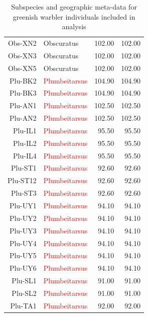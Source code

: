 \documentclass[12pt]{article}
\begin{document}
\begin{table}
\begin{tabular}{rlrr}
   Obs-XN2 & \textcolor{BurntOrange}{Obscuratus} & 102.00 & 102.00 \\ 
   Obs-XN3 & \textcolor{BurntOrange}{Obscuratus} & 102.00 & 102.00 \\ 
   Obs-XN5 & \textcolor{BurntOrange}{Obscuratus} & 102.00 & 102.00 \\ 
      \hline
   Plu-BK2 & \textcolor{red}{Plumbeitarsus} & 104.90 & 104.90 \\ 
   Plu-BK3 & \textcolor{red}{Plumbeitarsus} & 104.90 & 104.90 \\ 
   Plu-AN1 & \textcolor{red}{Plumbeitarsus} & 102.50 & 102.50 \\ 
   Plu-AN2  & \textcolor{red}{Plumbeitarsus} & 102.50 & 102.50 \\ 
   Plu-IL1 & \textcolor{red}{Plumbeitarsus} & 95.50 & 95.50 \\ 
   Plu-IL2 & \textcolor{red}{Plumbeitarsus} & 95.50 & 95.50 \\ 
   Plu-IL4 & \textcolor{red}{Plumbeitarsus} & 95.50 & 95.50 \\ 
   Plu-ST1 & \textcolor{red}{Plumbeitarsus} & 92.60 & 92.60 \\ 
   Plu-ST12 & \textcolor{red}{Plumbeitarsus} & 92.60 & 92.60 \\ 
   Plu-ST3 & \textcolor{red}{Plumbeitarsus} & 92.60 & 92.60 \\ 
   Plu-UY1 & \textcolor{red}{Plumbeitarsus} & 94.10 & 94.10 \\ 
   Plu-UY2 & \textcolor{red}{Plumbeitarsus} & 94.10 & 94.10 \\ 
   Plu-UY3 & \textcolor{red}{Plumbeitarsus} & 94.10 & 94.10 \\ 
   Plu-UY4 & \textcolor{red}{Plumbeitarsus} & 94.10 & 94.10 \\ 
   Plu-UY5 & \textcolor{red}{Plumbeitarsus} & 94.10 & 94.10 \\ 
   Plu-UY6 & \textcolor{red}{Plumbeitarsus} & 94.10 & 94.10 \\ 
   Plu-SL1 & \textcolor{red}{Plumbeitarsus} & 91.00 & 91.00 \\ 
   Plu-SL2 & \textcolor{red}{Plumbeitarsus} & 91.00 & 91.00 \\ 
   Plu-TA1 & \textcolor{red}{Plumbeitarsus} & 92.00 & 92.00 \\ 
   \hline
   \end{tabular}
   \caption{Subspecies and geographic meta-data for greenish warbler individuals included in analysis}
   \label{tab:warbler_data_table}
\end{table}
\end{document}
